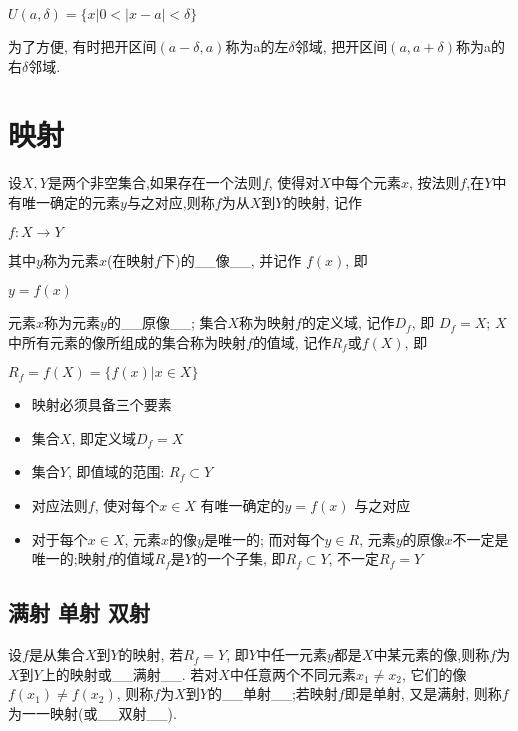 \documentclass[11pt]{article}
\providecommand{\tightlist}{%
      \setlength{\itemsep}{0pt}\setlength{\parskip}{0pt}}
\begin{document}
\(U(a, \delta)=\{x| 0<|x-a|<\delta \}\)

为了方便, 有时把开区间\((a - \delta, a)\)称为a的左\(\delta\)邻域,
把开区间\((a, a+ \delta)\)称为a的右\(\delta\)邻域.

\section{映射}\label{ux6620ux5c04}

设\(X, Y\)是两个非空集合,如果存在一个法则\(f\),
使得对\(X\)中每个元素\(x\),
按法则\(f\),在\(Y\)中有唯一确定的元素\(y\)与之对应,则称\(f\)为从\(X\)到\(Y\)的映射,
记作

\(f : X \rightarrow Y\)

其中\(y\)称为元素\(x\)(在映射\(f\)下)的\_\_像\_\_, 并记作 \(f(x)\), 即

\(y = f(x)\)

元素\(x\)称为元素\(y\)的\_\_原像\_\_; 集合\(X\)称为映射\(f\)的定义域,
记作\(D_{f}\), 即 \(D_{f}=X\);
\(X\)中所有元素的像所组成的集合称为映射\(f\)的值域,
记作\(R_{f}\)或\(f(X)\), 即

\(R_{f}=f(X)=\{f(x) | x \in X\}\)

\begin{itemize}
\tightlist
\item
  映射必须具备三个要素
\item
  集合\(X\), 即定义域\(D_{f} = X\)
\item
  集合\(Y\), 即值域的范围: \(R_{f} \subset Y\)
\item
  对应法则\(f\), 使对每个\(x \in X\) 有唯一确定的\(y = f(x)\) 与之对应
\item
  对于每个\(x \in X\), 元素\(x\)的像\(y\)是唯一的; 而对每个\(y \in R\),
  元素\(y\)的原像\(x\)不一定是唯一的;映射\(f\)的值域\(R_{f}\)是\(Y\)的一个子集,
  即\(R_{f} \subset Y\), 不一定\(R_{f} = Y\)
\end{itemize}

\subsection{满射 单射
双射}\label{ux6ee1ux5c04-ux5355ux5c04-ux53ccux5c04}

设\(f\)是从集合\(X\)到\(Y\)的映射, 若\(R_{f} = Y\),
即\(Y\)中任一元素\(y\)都是\(X\)中某元素的像,则称\(f\)为\(X\)到\(Y\)上的映射或\_\_满射\_\_.
若对\(X\)中任意两个不同元素\(x_{1} \ne x_{2}\),
它们的像\(f(x_{1}) \ne f(x_{2})\),
则称\(f\)为\(X\)到\(Y\)的\_\_单射\_\_;若映射\(f\)即是单射, 又是满射,
则称\(f\)为一一映射(或\_\_双射\_\_).
\end{document}
